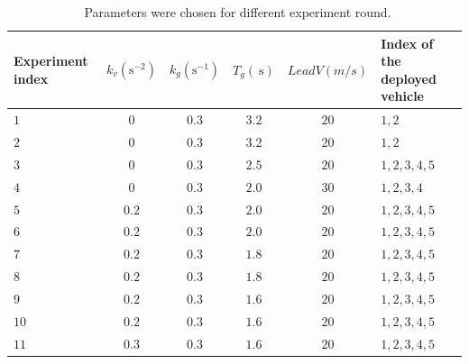 \documentclass[journal]{IEEEtran}
\begin{document}
\begin{table}
  \centering
  \setlength{\abovecaptionskip}{0pt}
  \setlength{\belowcaptionskip}{10pt}%
  \caption{~Parameters were chosen for different experiment round.}
  {\begin{tabular}{lccccl} \toprule
      Experiment index & $k_{v} (\mathrm{s}^{-2})$ & $k_{g} (\mathrm{s}^{-1})$ & $T_{g} (\mathrm{~s})$ & $LeadV (m/s)$ & Index of the deployed vehicle \\ \midrule
      $1 $             & $0$                       & $0.3 $                    & $3.2$                 & $20$          & $1,2$                         \\
      $2 $             & $0$                       & $0.3 $                    & $3.2$                 & $20$          & $1,2$                         \\
      $3 $             & $0$                       & $0.3 $                    & $2.5$                 & $20$          & $1,2,3,4,5$                   \\
      $4 $             & $0$                       & $0.3 $                    & $2.0$                 & $30$          & $1,2,3,4$                     \\
      $5 $             & $0.2$                     & $0.3 $                    & $2.0$                 & $20$          & $1,2,3,4,5$                   \\
      $6 $             & $0.2$                     & $0.3 $                    & $2.0$                 & $20$          & $1,2,3,4,5$                   \\
      $7 $             & $0.2$                     & $0.3 $                    & $1.8$                 & $20$          & $1,2,3,4,5$                   \\
      $8 $             & $0.2$                     & $0.3 $                    & $1.8$                 & $20$          & $1,2,3,4,5$                   \\
      $9 $             & $0.2$                     & $0.3 $                    & $1.6$                 & $20$          & $1,2,3,4,5$                   \\
      $10$             & $0.2$                     & $0.3 $                    & $1.6$                 & $20$          & $1,2,3,4,5$                   \\
      $11$             & $0.3$                     & $0.3 $                    & $1.6$                 & $20$          & $1,2,3,4,5$                   \\

\end{tabular}}
\end{table}
\end{document}
